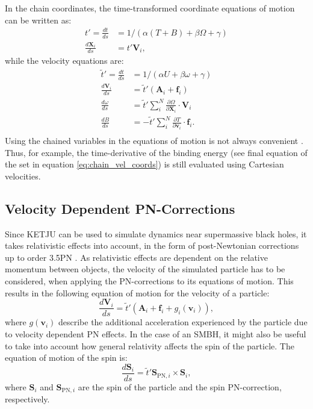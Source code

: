 \documentclass[english, twoside]{HYgradu}
\begin{document}
In the chain coordinates, the time-transformed coordinate equations of motion can be written as:
\begin{equation}
\begin{split}
t'= \frac{dt}{ds} &= 1/(\alpha(T+B) + \beta\Omega + \gamma) \\
\frac{d\mathbf{X}_i}{ds} &= t' \mathbf{V}_i,
\end{split}
\end{equation}
while the velocity equations are:
\begin{equation}
\begin{split}
\tilde{t}' = \frac{dt}{ds} &= 1/(\alpha U + \beta\omega + \gamma) \\
\frac{d\mathbf{V}_i}{ds} &= \tilde{t}' (\mathbf{A}_i + \mathbf{f}_i) \\
\frac{d\omega}{ds} &= \tilde{t}' \displaystyle\sum^N_i \frac{\partial \Omega}{\partial \mathbf{X}_i} \cdot \mathbf{V}_i \\
\frac{dB}{ds} &= -\tilde{t}' \displaystyle\sum^N_i \frac{\partial T}{\partial \mathbf{v}_i} \cdot \mathbf{f}_i. \\
\end{split} \label{eq:chain_vel_coords}
\end{equation}
Using the chained variables in the equations of motion is not always convenient \citep{Mikkola2008ARCHAIN}. Thus, for example, the time-derivative of the binding energy (see final equation of the set in equation \ref{eq:chain_vel_coords}) is still evaluated using Cartesian velocities.

\subsection{Velocity Dependent PN-Corrections}

Since KETJU can be used to simulate dynamics near supermassive black holes, it takes relativistic effects into account, in the form of post-Newtonian corrections up to order 3.5PN \citep{Rantala2017KETJU}. As relativistic effects are dependent on the relative momentum between objects, the velocity of the simulated particle has to be considered, when applying the PN-corrections to its equations of motion. This results in the following equation of motion for the velocity of a particle:
\begin{equation}
\frac{d\mathbf{V}_i}{ds} = \tilde{t}' (\mathbf{A}_i + \mathbf{f}_i + g_i(\mathbf{v}_i)), \label{eq:velocity_eom_pn}
\end{equation}
where $g(\mathbf{v}_i)$ describe the additional acceleration experienced by the particle due to velocity dependent PN effects. In the case of an SMBH, it might also be useful to take into account how general relativity affects the spin of the particle. The equation of motion of the spin is: 
\begin{equation}
\frac{d\mathbf{S}_i}{ds} = \tilde{t}' \mathbf{S}_{\mathrm{PN},i} \times \mathbf{S}_i, \label{eq:spin_eom_pn}
\end{equation}
where $\mathbf{S}_i$ and $\mathbf{S}_{\mathrm{PN},i}$ are the spin of the particle and the spin PN-correction, respectively.
\end{document}
